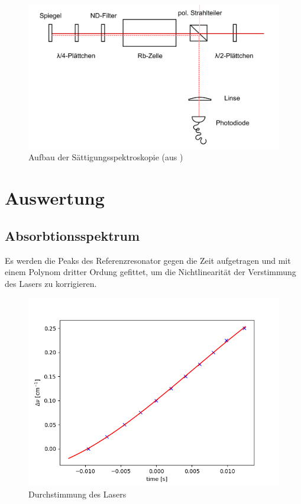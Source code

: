 \documentclass[a4paper,parskip]{scrartcl}
\begin{document}
\begin{figure}[h]
\centering
\includegraphics[width=\textwidth]{Aufbau_2.png}
\caption{Aufbau der Sättigungsspektroskopie (aus \cite{Ref:3})}
\end{figure}

\section{Auswertung}

\subsection{Absorbtionsspektrum}

Es werden die Peaks des Referenzresonator gegen die Zeit aufgetragen und mit einem Polynom dritter Ordung gefittet, um die Nichtlinearität der Verstimmung des Lasers zu korrigieren.

\begin{figure}[h]
\centering
\includegraphics[scale = 0.5]{./absorbtion/frequencyCorrection}
\caption{Durchstimmung des Lasers}
\end{figure}
\end{document}
